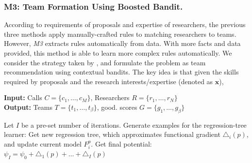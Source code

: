\subsubsection{M3: Team Formation Using Boosted Bandit.}
According to requirements of proposals and expertise of researchers, the previous three methods apply manually-crafted rules to matching researchers to teams. However, {\it M3} extracts rules automatically from data. With more facts and data provided, this method is able to learn more complex rules automatically. We consider the strategy taken by \cite{kakadiya2021relational}, and formulate the problem as team recommendation using contextual bandits. The key idea is that given the skills required by proposals and the research interests/expertise (denoted as $\mathbf{x}$), 
\begin{algorithm} 
\caption{{\it M3:} Team Formation Using Boosted Bandit} 
{\small
 \begin{flushleft}
        \hspace*{\algorithmicindent} 
        \textbf{Input:} Calls $C=\{c_1, \ldots, c_M\}$, Researchers $R=\{r_1, \ldots, r_N\}$\\
        \hspace*{\algorithmicindent} 
        \textbf{Output:} Teams $T=\{t_1, \ldots, t_\beta\}$, good. scores
        $G=\{g_1, \ldots, g_\beta\}$
 \end{flushleft}
 \label{algo:m3}
	\begin{algorithmic}[1]
            \State Let $I$ be a pre-set number of iterations.
                \State Generate examples for the
regression-tree learner: 
                \State Get new regression tree, which approximates functional gradient $\triangle_i(p)$, and update current model $F^p_i$.
                \EndFor
            \State Get final potential: $\psi_I=\psi_0+\triangle_1(p)+\ldots+\triangle_I(p)$
            \EndFor
        \State \Return
        

\end{algorithmic}}
\end{algorithm}
